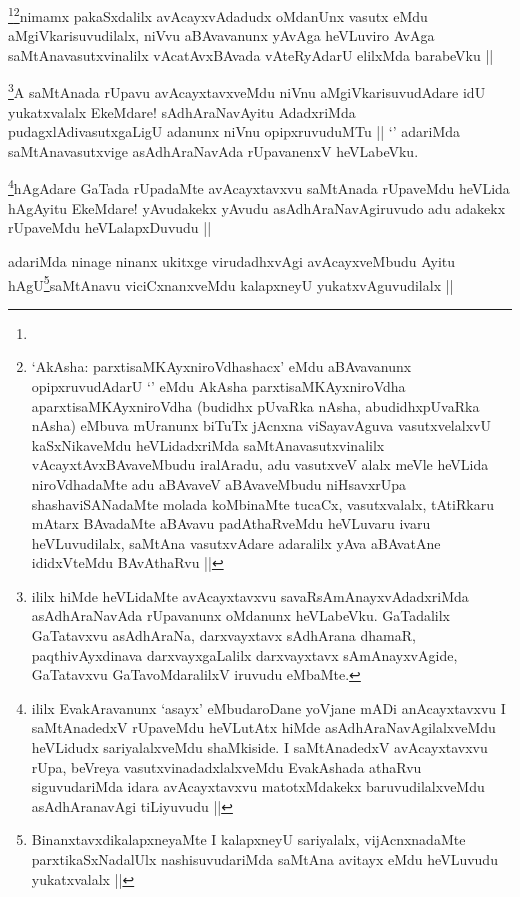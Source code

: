 \begin{artha}
\footnote{}\footnote{`AkAsha: parxtisaMKAyxniroVdhashacx' eMdu aBAvavanunx opipxruvudAdarU `\stext' eMdu AkAsha parxtisaMKAyxniroVdha aparxtisaMKAyxniroVdha (budidhx pUvaRka nAsha, abudidhxpUvaRka nAsha) eMbuva mUranunx biTuTx jAcnxna viSayavAguva vasutxvelalxvU kaSxNikaveMdu heVLidadxriMda saMtAnavasutxvinalilx vAcayxtAvxBAvaveMbudu iralAradu, adu vasutxveV alalx meVle heVLida niroVdhadaMte adu aBAvaveV aBAvaveMbudu niHsavxrUpa shashaviSANadaMte molada koMbinaMte tucaCx, vasutxvalalx, tAtiRkaru mAtarx BAvadaMte aBAvavu padAthaRveMdu heVLuvaru ivaru heVLuvudilalx, saMtAna vasutxvAdare adaralilx yAva aBAvatAne ididxVteMdu BAvAthaRvu ||}nimamx pakaSxdalilx avAcayxvAdadudx oMdanUnx vasutx eMdu aMgiVkarisuvudilalx, niVvu aBAvavanunx yAvAga heVLuviro AvAga saMtAnavasutxvinalilx vAcatAvxBAvada vAteRyAdarU elilxMda barabeVku ||
\end{artha}

\begin{artha}
\footnote{ililx hiMde heVLidaMte avAcayxtavxvu savaRsAmAnayxvAdadxriMda asAdhAraNavAda rUpavanunx oMdanunx heVLabeVku. GaTadalilx GaTatavxvu asAdhAraNa, darxvayxtavx sAdhArana dhamaR, paqthivAyxdinava darxvayxgaLalilx darxvayxtavx sAmAnayxvAgide, GaTatavxvu GaTavoMdaralilxV iruvudu eMbaMte.}A saMtAnada rUpavu avAcayxtavxveMdu niVnu aMgiVkarisuvudAdare idU yukatxvalalx EkeMdare! sAdhAraNavAyitu AdadxriMda pudagxlAdivasutxgaLigU adanunx niVnu opipxruvuduMTu || `\stext' adariMda saMtAnavasutxvige asAdhAraNavAda rUpavanenxV heVLabeVku.
\end{artha}

\begin{artha}
\footnote{ililx EvakAravanunx `asayx' eMbudaroDane yoVjane mADi anAcayxtavxvu I saMtAnadedxV rUpaveMdu heVLutAtx hiMde asAdhAraNavAgilalxveMdu heVLidudx sariyalalxveMdu shaMkiside. I saMtAnadedxV avAcayxtavxvu rUpa, beVreya vasutxvinadadxlalxveMdu EvakAshada athaRvu siguvudariMda idara avAcayxtavxvu matotxMdakekx baruvudilalxveMdu asAdhAranavAgi tiLiyuvudu ||}hAgAdare GaTada rUpadaMte avAcayxtavxvu saMtAnada rUpaveMdu heVLida hAgAyitu EkeMdare! yAvudakekx yAvudu asAdhAraNavAgiruvudo adu adakekx rUpaveMdu heVLalapxDuvudu ||
\end{artha}

\begin{artha}
adariMda ninage ninanx ukitxge virudadhxvAgi avAcayxveMbudu Ayitu hAgU\footnote{BinanxtavxdikalapxneyaMte I kalapxneyU sariyalalx, vijAcnxnadaMte parxtikaSxNadalUlx nashisuvudariMda saMtAna avitayx eMdu heVLuvudu yukatxvalalx ||}saMtAnavu viciCxnanxveMdu kalapxneyU yukatxvAguvudilalx ||
\end{artha}

